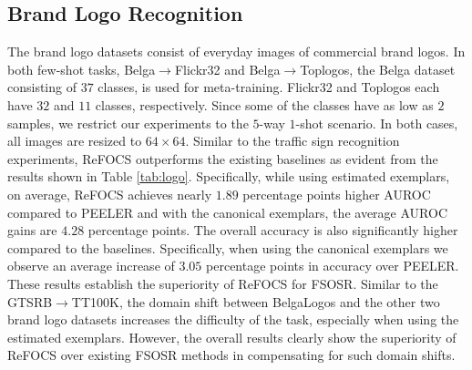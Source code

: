 



\subsection{Brand Logo Recognition}
The brand logo datasets consist of everyday images of commercial brand logos. In both few-shot tasks, Belga$\rightarrow$Flickr32 and Belga$\rightarrow$Toplogos, the Belga dataset consisting of $37$ classes, is used for meta-training. Flickr32 and Toplogos each have $32$ and $11$ classes, respectively. Since some of the classes have as low as $2$ samples, we restrict our experiments to the $5$-way $1$-shot scenario. In both cases, all images are resized to $64 \times 64$. Similar to the traffic sign recognition experiments, ReFOCS outperforms the existing baselines as evident from the results shown in  Table \ref{tab:logo}. Specifically, while using estimated exemplars, on average, ReFOCS achieves nearly $\mathbf{1.89}$ percentage points higher AUROC compared to PEELER and with the canonical exemplars, the average AUROC gains are $\mathbf{4.28}$ percentage points. The overall accuracy is also significantly higher compared to the  baselines. Specifically, when using the canonical exemplars we observe an average increase of $\mathbf{3.05}$ percentage points in accuracy over PEELER. These results establish the superiority of ReFOCS for FSOSR. Similar to the GTSRB$\rightarrow$TT100K, the domain shift between BelgaLogos and the other two brand logo datasets increases the difficulty of the task, especially when using the estimated exemplars. However, the overall results clearly show the superiority of ReFOCS over existing FSOSR methods in compensating for such domain shifts. 



